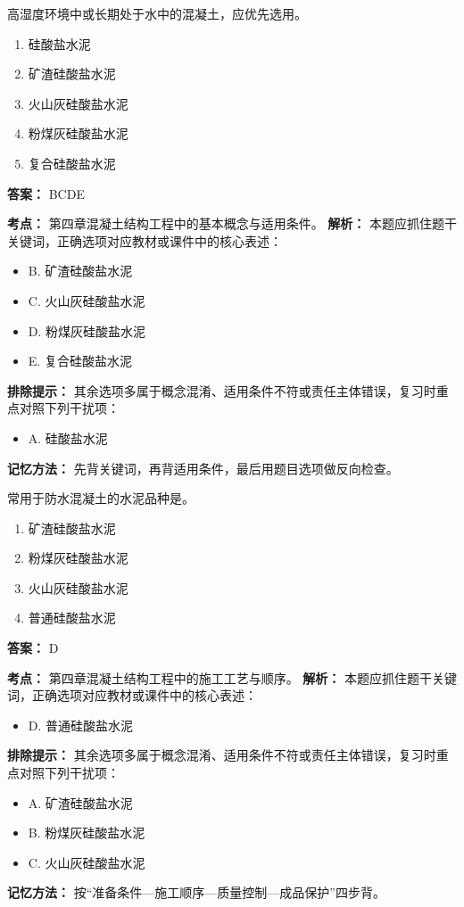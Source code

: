 \documentclass[UTF8,fontset=fandol,11pt]{ctexart}
\begin{document}
\begin{quizbox}[title={第 60 题}]
高湿度环境中或长期处于水中的混凝土，应优先选用。\\
\begin{enumerate}[label=\Alph*.]
\item 硅酸盐水泥
\item 矿渣硅酸盐水泥
\item 火山灰硅酸盐水泥
\item 粉煤灰硅酸盐水泥
\item 复合硅酸盐水泥
\end{enumerate}
\textbf{答案：} BCDE
\vspace{0.25em}
\begin{answerbox}[title={考点解析}]
\textbf{考点：} 第四章混凝土结构工程中的基本概念与适用条件。
\textbf{解析：} 本题应抓住题干关键词，正确选项对应教材或课件中的核心表述：
\begin{itemize}
\item B. 矿渣硅酸盐水泥
\item C. 火山灰硅酸盐水泥
\item D. 粉煤灰硅酸盐水泥
\item E. 复合硅酸盐水泥
\end{itemize}
\textbf{排除提示：} 其余选项多属于概念混淆、适用条件不符或责任主体错误，复习时重点对照下列干扰项：
\begin{itemize}
\item A. 硅酸盐水泥
\end{itemize}
\textbf{记忆方法：} 先背关键词，再背适用条件，最后用题目选项做反向检查。
\end{answerbox}
\end{quizbox}

\begin{quizbox}[title={第 61 题}]
常用于防水混凝土的水泥品种是。\\
\begin{enumerate}[label=\Alph*.]
\item 矿渣硅酸盐水泥
\item 粉煤灰硅酸盐水泥
\item 火山灰硅酸盐水泥
\item 普通硅酸盐水泥
\end{enumerate}
\textbf{答案：} D
\vspace{0.25em}
\begin{answerbox}[title={考点解析}]
\textbf{考点：} 第四章混凝土结构工程中的施工工艺与顺序。
\textbf{解析：} 本题应抓住题干关键词，正确选项对应教材或课件中的核心表述：
\begin{itemize}
\item D. 普通硅酸盐水泥
\end{itemize}
\textbf{排除提示：} 其余选项多属于概念混淆、适用条件不符或责任主体错误，复习时重点对照下列干扰项：
\begin{itemize}
\item A. 矿渣硅酸盐水泥
\item B. 粉煤灰硅酸盐水泥
\item C. 火山灰硅酸盐水泥
\end{itemize}
\textbf{记忆方法：} 按“准备条件—施工顺序—质量控制—成品保护”四步背。
\end{answerbox}
\end{quizbox}
\end{document}
